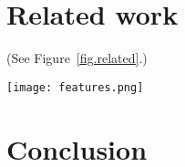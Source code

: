 \documentclass[10pt]{sensys-proc}
\newcommand{\CEU}{\textsc{C\'{e}u}\xspace}
\newcommand{\code}[1] {{\small{\texttt{#1}}}}
\newcommand{\Code}[1] {\texttt{#1}}
\begin{document}
\section{Related work}
\label{sec.related}

(See Figure~\ref{fig.related}.)

\begin{figure*}[t]
\texttt{[image: features.png]}
\caption{ Table of features found in related works to \CEU.
\label{fig.related}
}
\end{figure*}

\section{Conclusion}
\label{sec.conclusion}


\begin{comment}
CONCLUSION
Note that one of the main objectives of \CEU is to enhance safety in concurrent 
patterns, in the sense that if the programmer sticks to \CEU primitives for 
control patterns it will gain...
avoid cycles
The stack execution policy for internal events can express nested emits, and 
also avoids dependency cycles in programs.

In \CEU, there are three possible sources of non-determinism:
\emph{concurrent access to variables} (e.g. \code{(1=>a\&\&2=>a)}),
\emph{concurrent \emph{par/or} termination} (e.g. \code{(1||2)=>a}, might yield 
$1$ or $2$), and \emph{concurrent loop escape}%
\footnote{ The token \brk{} escapes the innermost loop with its preceding 
expression. }
(e.g. \code{(1\brk{} \&\& 2\brk)* =>a}).

During compile time, \CEU{} converts programs into deterministic finite 
automatons in order to detect the three forms of non-determinism.
This conversion is the reason why \CEU{} is a static language.
A DFA unequivocally represents a \CEU{} program, covering exactly all possible 
paths it can reach during runtime.
For instance, the following program is identified as non-deterministic, because 
the variable $v$ is accessed concurrently on the 6th occurrence of the event 
$A$:

\Code{
(\til{}A; \til{}A; 1=>v)*
\&\&
(\til{}A; \til{}A; \til{}A; v)*
}

\end{comment}
\end{document}
